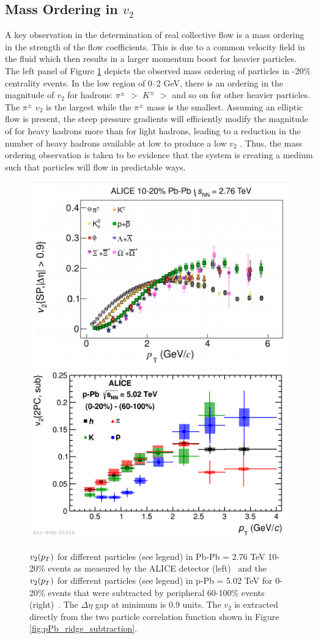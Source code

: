 \subsection{Mass Ordering in $v_2$}
A key observation in the determination of real collective flow is a mass ordering in the strength of the flow coefficients. This is due to a common velocity field in the fluid which then results in a larger momentum boost for heavier particles. The left panel of Figure \ref{fig:PbpPb_mass_ordering} depicts the observed mass ordering of particles in -20\% centrality events. In the low \pt region of 0--2 GeV, there is an ordering in the magnitude of $v_2$ for hadrons: $\pi^{\pm}$ $>$ $K^{\pm}$ $>$ \ppbar and so on for other heavier particles. The $\pi^{\pm}$ $v_2$ is the largest while the $\pi^{\pm}$ mass is the smallest. Assuming an elliptic flow is present, the steep pressure gradients will efficiently modify the magnitude of \pt for heavy hadrons more than for light hadrons, leading to a reduction in the number of heavy hadrons available at low \pt to produce a low \pt $v_2$ \cite{PhysRevC.77.044909}. Thus, the mass ordering observation is taken to be evidence that the system is creating a medium such that particles will flow in predictable ways.

\begin{figure}[h!]
\begin{center}
\includegraphics[width=0.48\linewidth]{figs/PbPb_v2_mass_ordering.PNG}
\includegraphics[width=0.48\linewidth]{figs/pPb_two_part_v2_mass_ordering.PNG}
\caption{$v_2(\mbox{$p_T$})$ for different particles (see legend) in Pb-Pb \sqsn = 2.76 TeV 10-20\% events as measured by the ALICE detector (left)~\cite{Adam2016} and the $v_2(\mbox{$p_T$})$ for different particles (see legend) in p-Pb \sqsn = 5.02 TeV for 0-20\% events that were subtracted by peripheral 60-100\% events (right)~\cite{Abelev2013164}. The $\Delta\eta$ gap at minimum is 0.9 units. The $v_2$ is extracted directly from the two particle correlation function shown in Figure \ref{fig:pPb_ridge_subtraction}. }
\label{fig:PbpPb_mass_ordering}
\end{center}
\end{figure}

